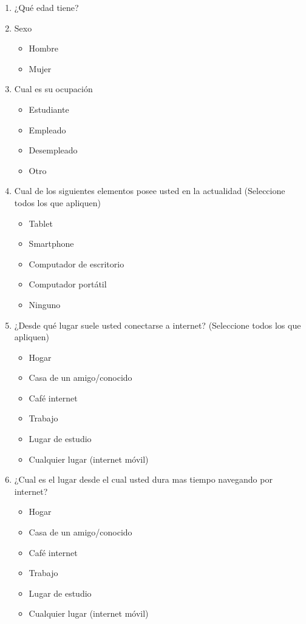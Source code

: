 \begin{enumerate}
  \item ¿Qué edad tiene?
  \item Sexo
  \begin{itemize}
    \item Hombre
    \item Mujer
  \end{itemize}
  \item Cual es su ocupación
  \begin{itemize}
    \item Estudiante
    \item Empleado
    \item Desempleado
    \item Otro
  \end{itemize}
  \item Cual de los siguientes elementos posee usted en la actualidad (Seleccione todos los que apliquen)
  \begin{itemize}
    \item Tablet
    \item Smartphone
    \item Computador de escritorio
    \item Computador portátil
    \item Ninguno
  \end{itemize}
  \item ¿Desde qué lugar suele usted conectarse a internet? (Seleccione todos los que apliquen)
  \begin{itemize}
    \item Hogar
    \item Casa de un amigo/conocido
    \item Café internet
    \item Trabajo
    \item Lugar de estudio
    \item Cualquier lugar (internet móvil)
  \end{itemize}
  \item ¿Cual es el lugar desde el cual usted dura mas tiempo navegando por internet?
  \begin{itemize}
    \item Hogar
    \item Casa de un amigo/conocido
    \item Café internet
    \item Trabajo
    \item Lugar de estudio
    \item Cualquier lugar (internet móvil)

\end{itemize}
\end{enumerate}
